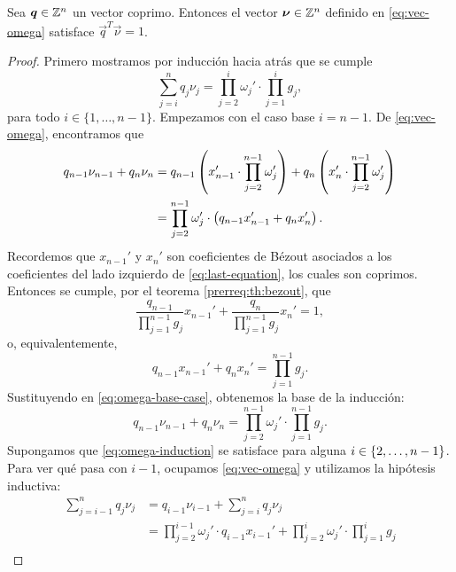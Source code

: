 \begin{lemma} \label{lemma:iso1}
	Sea $\boldsymbol{q} \in \mathbb{Z}^{n}$ un vector coprimo. Entonces el vector $\boldsymbol{\nu}
	\in \mathbb{Z}^n$ definido en \eqref{eq:vec-omega} satisface $\vec{q}^T\vec{\nu} =
	1$.
\end{lemma}
\begin{proof}
	Primero mostramos por inducción hacia atrás que se cumple
	\begin{equation}
		\label{eq:omega-induction} \sum_{j=i}^{n}q_j\nu_j =
		\prod_{j=2}^{i}\omega_j' \cdot \prod_{j=1}^{i}g_j,
	\end{equation}
	para todo $i \in \lbrace 1, \ldots, n - 1\rbrace$. Empezamos con el caso base $i = n - 1$. De
	\eqref{eq:vec-omega}, encontramos que
	\begin{align}
		\label{eq:omega-base-case}
		q_{n-1}\nu_{n-1} + q_n\nu_n &=
		q_{n-1}\left( x_{n-1}' \cdot \prod_{j=2}^{n-1}\omega_j' \right) + 
		q_{n}\left( x_n' \cdot \prod_{j=2}^{n-1}\omega_j' \right) \nonumber \\
									&=
		\prod_{j=2}^{n-1}\omega_j' \cdot \left(q_{n-1}x_{n-1}' + q_nx_n'\right).
	\end{align}
	Recordemos que $x_{n-1}'$ y $x_n'$ son coeficientes de Bézout asociados a los coeficientes del
	lado izquierdo de \eqref{eq:last-equation}, los cuales son coprimos. Entonces se cumple, por el
	teorema \ref{prerreq:th:bezout}, que
	\begin{equation*}
		\frac{q_{n-1}}{\prod_{j=1}^{n-1}g_j}x_{n-1}' +
		\frac{q_n}{\prod_{j=1}^{n-1}g_j}x_n' = 1,
	\end{equation*}
	o, equivalentemente,
	\begin{equation*}
		q_{n-1}x_{n-1}' + q_nx_n' = \prod_{j=1}^{n-1}g_j.
	\end{equation*}
	Sustituyendo en \eqref{eq:omega-base-case}, obtenemos la base de la inducción:
	\begin{equation*}
		q_{n-1}\nu_{n-1} + q_n\nu_n  =
		\prod_{j=2}^{n-1}\omega_j' \cdot \prod_{j=1}^{n-1}g_j.
	\end{equation*}
	Supongamos que \eqref{eq:omega-induction} se satisface para alguna $i \in \lbrace 2, \ldots, n -
	1 \rbrace$. Para ver qué pasa con $i - 1$, ocupamos \eqref{eq:vec-omega} y utilizamos la hipótesis
	inductiva:
	\begin{align*}
		\sum_{j=i-1}^{n}q_j\nu_j
		&= q_{i-1}\nu_{i-1} + \sum_{j=i}^{n}q_j\nu_j \\
		&= \prod_{j=2}^{i-1}\omega_j' \cdot q_{i-1}x_{i-1}' + \prod_{j=2}^{i}\omega_j' \cdot
		\prod_{j=1}^{i}g_j \\

\end{align*}
\end{proof}
